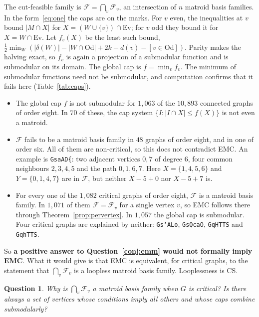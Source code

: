 \documentclass[11pt]{amsart}
\newtheorem{question}[theorem]{Question}
\theoremstyle{definition}
\newcommand{\Ev}{\mathrm{Ev}}
\newcommand{\Od}{\mathrm{Od}}
\newcommand{\cF}{\mathcal F}
\begin{document}
The cut-feasible family is $\cF=\bigcap_v\cF_v$, an intersection of $n$ matroid basis families. In
the form~\eqref{eq:one} the caps are on the marks. For $v$ even, the inequalities at $v$ bound
$|M\cap X|$ for $X=(W\cup\{v\})\cap\Ev$; for $v$ odd they bound it for $X=W\cap\Ev$. Let $f_v(X)$ be
the least such bound, $\tfrac12\min_W(|\delta(W)|-|W\cap\Od|+2k-d(v)-[v\in\Od])$. Parity makes the
halving exact, so $f_v$ is again a projection of a submodular function and is submodular on its
domain. The global cap is $f=\min_v f_v$. The minimum of submodular functions need not be
submodular, and computation confirms that it fails here (Table~\ref{tab:caps}).
\begin{itemize}
\item The global cap $f$ is not submodular for $1{,}063$ of the $10{,}893$ connected graphs of order
eight. In $70$ of these, the cap system $\{I:|I\cap X|\le f(X)\}$ is not even a matroid.
\item $\cF$ fails to be a matroid basis family in $48$ graphs of order eight, and in one of order
six. All of them are non-critical, so this does not contradict EMC. An example is
\texttt{GsaAD\{}: two adjacent vertices $0,7$ of degree $6$, four common neighbours $2,3,4,5$ and the
path $0,1,6,7$. Here $X=\{1,4,5,6\}$ and $Y=\{0,1,4,7\}$ are in $\cF$, but neither
$X-5+0$ nor $X-5+7$ is.
\item For every one of the $1{,}082$ critical graphs of order eight, $\cF$ is a matroid basis family.
In $1{,}071$ of them $\cF=\cF_v$ for a single vertex $v$, so EMC follows there through
Theorem~\ref{prop:pervertex}. In $1{,}057$ the global cap is submodular. Four critical graphs are
explained by neither:
\texttt{Gs`ALo}, \texttt{GsQcaO}, \texttt{GqHTTS} and \texttt{GqhTTS}.
\end{itemize}
So \textbf{a positive answer to Question~\ref{conj:emm} would not formally imply EMC}. What it would
give is that EMC is equivalent, for
critical graphs, to the statement that $\bigcap_v\cF_v$ is a loopless matroid basis family.
Looplessness is CS.

\begin{question}\label{q:emc}
Why is $\bigcap_v\cF_v$ a matroid basis family when $G$ is critical? Is there always a set of
vertices whose conditions imply all others and whose caps combine submodularly?
\end{question}
\end{document}
